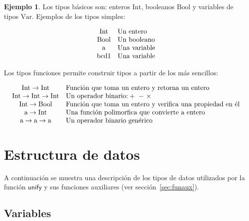 \documentclass{article}
\newcommand{\ms}[1]{\mathsf{#1}}
\theoremstyle{definition}
\newtheorem{example}{Ejemplo}[section]
\begin{document}
\begin{example}
Los tipos básicos son: enteros $\text{Int}$, booleanos $\text{Bool}$ y
variables de tipos $\text{Var}$. Ejemplos de los tipos simples:

\begin{equation*}
  \begin{array}[h]{cl}
    \text{Int} & \text{Un entero}
    \\
    \text{Bool} & \text{Un booleano}
    \\
    \text{a} & \text{Una variable}
    \\
    \text{bcd1} & \text{Una variable}
  \end{array}
\end{equation*}

Los tipos funciones permite construir tipos a partir de los más
sencillos:

\begin{equation*}
  \begin{array}[h]{cl}
    \text{Int} \to \text{Int} & \text{Función que toma un entero y
                                retorna un entero}
    \\
    \text{Int} \to \text{Int} \to \text{Int} & \text{Un operador
                                               binario:} +\ -\ \times
    \\
    \text{Int} \to \text{Bool} & \text{Función que toma un entero y
                                 verifica una propiedad en él}
    \\
    \text{a} \to \text{Int} & \text{Una función polimorfica que
                              convierte a entero}
    \\
    \text{a} \to \text{a} \to \text{a} & \text{Un operador binario
                                         genérico}
  \end{array}
\end{equation*}
\end{example}

\section{Estructura de datos}\label{sec:estructdatos}

A continuación se muestra una descripción de los tipos de datos
utilizados por la función $\ms{unify}$ y sus funciones auxiliares (ver
sección~\ref{sec:funaux}).

\subsection{Variables}
\label{sec:var}
\end{document}
